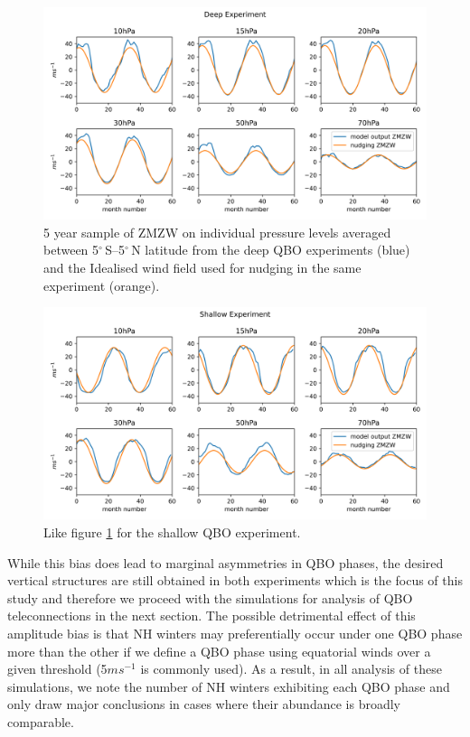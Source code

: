 \begin{figure}[h!]
\begin{center}
\noindent\includegraphics[width = 0.95\linewidth]{Figures/Figures-deepQBO/winds_on_lev_nudging_deep.png}
\caption[Equatorial ZMZW and nudging winds from the deep QBO]{5 year sample of ZMZW on individual pressure levels averaged between 5$^{\circ}$\,S--5$^{\circ}$\,N latitude from the deep QBO experiments (blue) and the Idealised wind field used for nudging in the same experiment (orange).}
\label{fig:winds_on_levs_deep}
\end{center}
\end{figure}

\begin{figure}[h!]
\begin{center}
\noindent\includegraphics[width = 0.95\linewidth]{Figures/Figures-deepQBO/winds_on_lev_nudging_shallow.png}
\caption[Equatorial ZMZW and nudging winds from the shallow QBO]{Like figure \ref{fig:winds_on_levs_deep} for the shallow QBO experiment.}
\label{fig:winds_on_levs_shallow}
\end{center}
\end{figure}

While this bias does lead to marginal asymmetries in QBO phases, the desired vertical structures are still obtained in both experiments which is the focus of this study and therefore we proceed with the simulations for analysis of QBO teleconnections in the next section. The possible detrimental effect of this amplitude bias is that NH winters may preferentially occur under one QBO phase more than the other if we define a QBO phase using equatorial winds over a given threshold (5$ms^{-1}$ is commonly used). As a result, in all analysis of these simulations, we note the number of NH winters exhibiting each QBO phase and only draw major conclusions in cases where their abundance is broadly comparable. 

